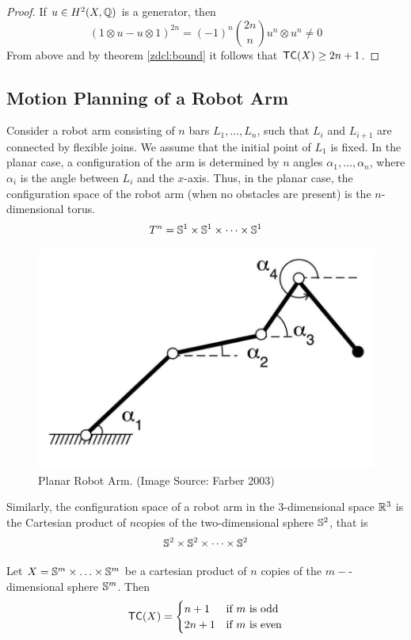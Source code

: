 \begin{proof}
    If $u \in H^2(X, \mathbb{Q})$ is a generator, then
    \[
        (1 \otimes u - u \otimes 1)^{2n} = (-1)^n \binom{2n}{n} u^n \otimes u^n \neq 0
    \]
    From above and by theorem \ref{zdcl:bound} it follows that $\textsf{TC}(X) \ge 2n + 1$.
\end{proof}


\subsection{Motion Planning of a Robot Arm}
Consider a robot arm consisting of $n$ bars $L_1, \ldots, L_n$, such that $L_i$ and $L_{i+1}$ are connected by flexible joins. 
We assume that the initial point of $L_1$ is fixed. 
In the planar case, a configuration of the arm is determined by $n$ angles $\alpha_1, \ldots, \alpha_n$, where $\alpha_i$ is the angle between $L_i$ and the $x$-axis. 
Thus, in the planar case, the configuration space of the robot arm (when no obstacles are present) is the $n$-dimensional torus.
\[
    T^n = \mathbb{S}^1 \times \mathbb{S}^1 \times \cdots \times \mathbb{S}^1
\]

\begin{figure}[h]
    \centering
    \includegraphics[scale=0.5]{images/planar-robot-arm.png}
    \caption[Planar Robot Arm]{Planar Robot Arm. (Image Source: Farber 2003)}
\end{figure}

Similarly, the configuration space of a robot arm in the $3$-dimensional space $\mathbb{R}^3$ is the Cartesian product of $n$copies of the two-dimensional sphere $\mathbb{S}^2$, that is
\[
    \mathbb{S}^2 \times \mathbb{S}^2 \times \cdots \times \mathbb{S}^2
\]

\begin{thm}\cite{farber2003topological}
    Let $X  = \mathbb{S}^m \times \ldots \times \mathbb{S}^m$ be a cartesian product of $n$ copies of the $m-$-dimensional sphere $\mathbb{S}^m$. Then
    \[
        \textsf{TC}(X) = \begin{cases}
            n + 1  & \text{if $m$ is odd}  \\
            2n + 1 & \text{if $m$ is even}
        \end{cases}
    \]
\end{thm}

